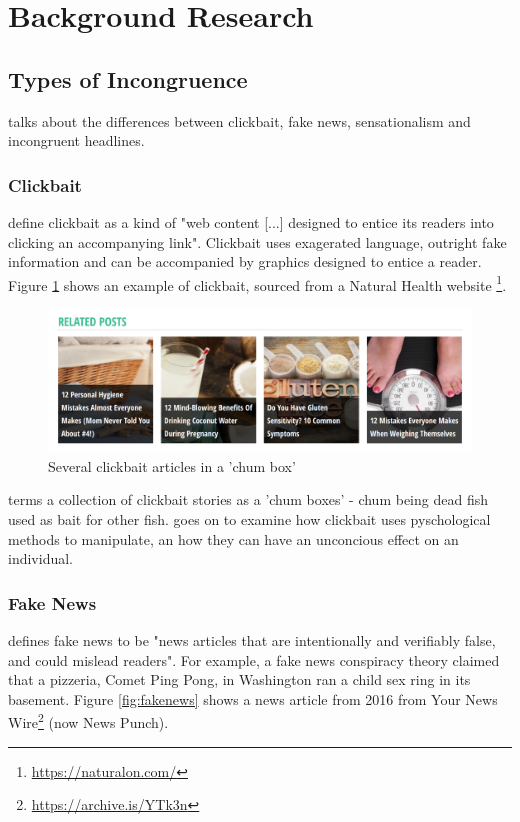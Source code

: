 
\section{Background Research}
\subsection{Types of Incongruence}
 talks about the differences between clickbait, fake news, sensationalism and incongruent headlines.

\subsubsection{Clickbait}
 define clickbait as a kind of "web content [...] designed to entice its readers into clicking an accompanying link". Clickbait uses exagerated language, outright fake information and can be accompanied by graphics designed to entice a reader. Figure \ref{fig:clickbait} shows an example of clickbait, sourced from a Natural Health website \footnote{\url{https://naturalon.com/}}.

\begin{figure}[h!]
  \includegraphics[width=\linewidth]{images/clickbait.png}
  \caption{Several clickbait articles in a 'chum box'}
  \label{fig:clickbait}
\end{figure}

 terms a collection of clickbait stories as a 'chum boxes' - chum being dead fish used as bait for other fish. \citeauthor{mahoney2015} goes on to examine how clickbait uses pyschological methods to manipulate, an how they can have an unconcious effect on an individual.

\subsubsection{Fake News}
 defines fake news to be "news articles that are intentionally and verifiably false, and could mislead readers". For example, a fake news conspiracy theory claimed that a pizzeria, Comet Ping Pong, in Washington ran a child sex ring in its basement. Figure \ref{fig:fakenews} shows a news article from 2016 from Your News Wire\footnote{\url{https://archive.is/YTk3n}} (now News Punch).


